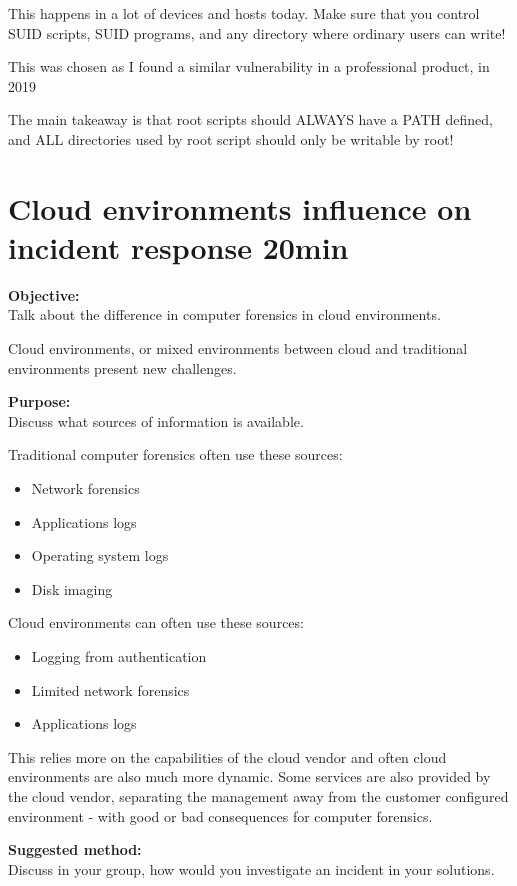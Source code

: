 \documentclass[a4paper,11pt,notitlepage]{report}
\begin{document}
This happens in a lot of devices and hosts today. Make sure that you control SUID scripts, SUID programs, and any directory where ordinary users can write!

This was chosen as I found a similar vulnerability in a professional product, in 2019

The main takeaway is that root scripts should ALWAYS have a PATH defined, and ALL directories used by root script should only be writable by root!


\chapter{Cloud environments influence on incident response 20min}
\label{ex:cloud-incident-response}

{\bf Objective:}\\
Talk about the difference in computer forensics in cloud environments.

Cloud environments, or mixed environments between cloud and traditional environments present new challenges.

{\bf Purpose:}\\
Discuss what sources of information is available.

Traditional computer forensics often use these sources:
\begin{itemize}
\item Network forensics
\item Applications logs
\item Operating system logs
\item Disk imaging
\end{itemize}

Cloud environments can often use these sources:

\begin{itemize}
\item Logging from authentication
\item Limited network forensics
\item Applications logs
\end{itemize}

This relies more on the capabilities of the cloud vendor and often cloud environments are also much more dynamic. Some services are also provided by the cloud vendor, separating the management away from the customer configured environment - with good or bad consequences for computer forensics.

{\bf Suggested method:}\\
Discuss in your group, how would you investigate an incident in your solutions.
\end{document}
